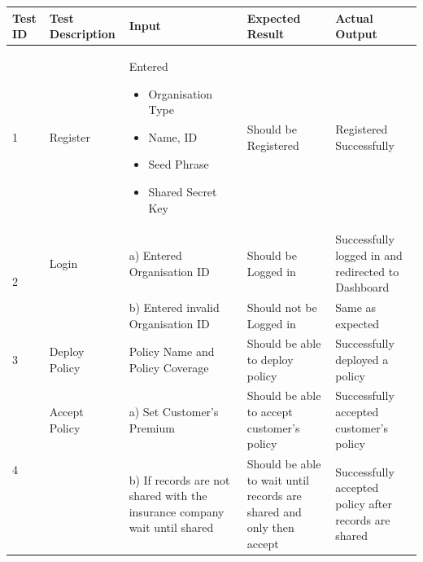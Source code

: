 \begin{table}[h!]
	\begin{tabular}{|p{.65cm}|p{2.5cm}|p{4cm}|p{3cm}|p{3.5cm}|} 
		\hline
		\centering\textbf{Test ID} & \centering\textbf{Test Description} & \centering\textbf{Input} & \centering\textbf{Expected Result} & \textbf{Actual Output} \\ \hline
         \scriptsize 1 &\scriptsize Register & \scriptsize 	Entered 
		\begin{itemize}
		\vspace{-5mm}
		    \item Organisation Type \vspace{-5mm}
		    \item Name, ID \vspace{-5mm}
		    \item Seed Phrase \vspace{-5mm}
		    \item Shared Secret Key
		\end{itemize} & \scriptsize Should be Registered & \scriptsize Registered Successfully  \\ \hline 
		 
		\multirow{2}{1em}{\scriptsize 2} &{\scriptsize Login} & \scriptsize a) Entered Organisation ID & \scriptsize Should be Logged in & \scriptsize Successfully logged in and redirected to Dashboard \\ 
		& & \scriptsize b) Entered invalid Organisation ID & \scriptsize Should not be Logged in & \scriptsize Same as expected \\
		\hline 
		\scriptsize3 & \scriptsize Deploy Policy & \scriptsize  Policy Name and Policy Coverage & \scriptsize Should be able to deploy policy & \scriptsize Successfully deployed a policy\\
		\hline
		
		\multirow{3}{1em}{\scriptsize 4} & {\scriptsize  Accept Policy }& \scriptsize a) Set Customer's Premium & \scriptsize Should be able to accept customer's policy  & \scriptsize Successfully accepted customer's policy \\
		& & \scriptsize b) If records are not shared with the insurance company wait until shared & \scriptsize Should be able to wait until records are shared and only then accept & \scriptsize Successfully accepted policy after records are shared \\
		\hline
		

\end{tabular}
\end{table}

